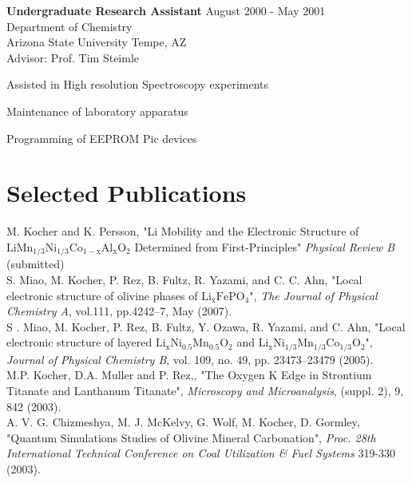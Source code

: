 \documentclass[margin,line]{resume}
\begin{document}
\begin{resume}
		\textbf{Undergraduate Research Assistant} \hfill August 2000 - May 2001\vspace{1mm}\\
		Department of Chemistry\\
Arizona State University Tempe, AZ\\
Advisor: Prof. Tim Steimle\\\vspace{-1.5mm}
		\begin{list2}
		\renewcommand{\labelitemi}{$\star$}
		\item Assisted in High resolution Spectroscopy experiments
		\item Maintenance of laboratory apparatus
		\item Programming of EEPROM Pic devices
		\end{list2}


  \section{\mysidestyle Selected Publications}
    M. Kocher and K. Persson, "Li Mobility and the Electronic Structure of $\mathrm{LiMn_{1/3}Ni_{1/3}Co_{1-x}Al_{x}O_{2}}$ Determined from First-Principles" \textsl{Physical Review B} (submitted)\vspace{2mm}\\
    S. Miao, M. Kocher, P. Rez, B. Fultz, R. Yazami, and C. C. Ahn, "Local electronic structure of olivine phases of $\mathrm{Li_xFePO_4}$", \textsl{The Journal of Physical Chemistry A}, vol.111, pp.4242–7, May (2007).\vspace{2mm}\\
    S . Miao, M. Kocher, P. Rez, B. Fultz, Y. Ozawa, R. Yazami, and C. Ahn, "Local electronic structure of layered $\mathrm{Li_xNi_{0.5}Mn_{0.5}O_2}$ and $\mathrm{Li_{x}Ni_{1/3}Mn_{1/3}Co_{1/3}O_2}$", \textsl{Journal of Physical Chemistry B}, vol. 109, no. 49, pp. 23473–23479 (2005).\vspace{2mm}\\
    M.P. Kocher, D.A. Muller and P. Rez,, "The Oxygen K Edge in Strontium Titanate and Lanthanum Titanate", \textsl{Microscopy and Microanalysis}, (suppl. 2), 9, 842 (2003).\vspace{2mm}\\
    A. V. G. Chizmeshya, M. J. McKelvy, G. Wolf, M. Kocher, D. Gormley, "Quantum Simulations Studies of Olivine Mineral Carbonation", \textsl{Proc. 28th International Technical Conference on Coal Utilization   \& Fuel Systems} 319-330 (2003).



\end{resume}
\end{document}
